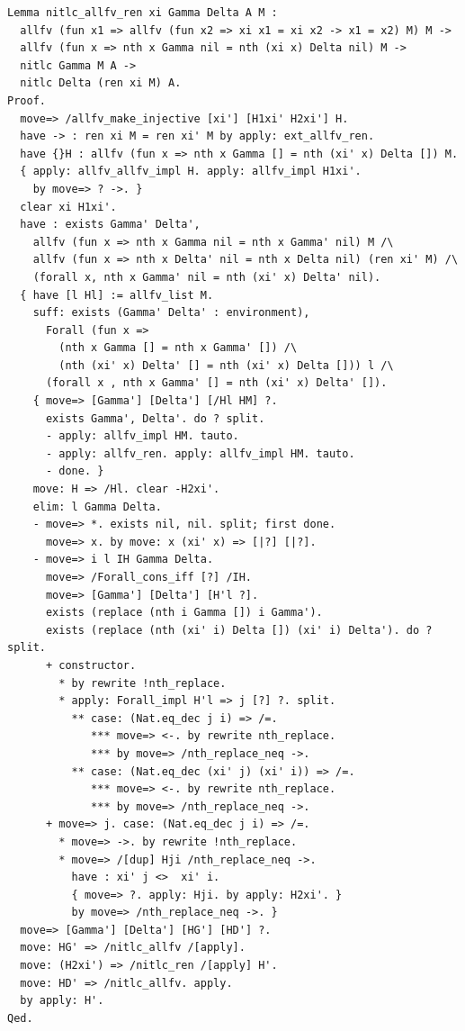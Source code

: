 \documentclass[10pt,a4paper]{article}
\begin{document}
\begin{lstlisting}[style=authorcoq]
Lemma nitlc_allfv_ren xi Gamma Delta A M :
  allfv (fun x1 => allfv (fun x2 => xi x1 = xi x2 -> x1 = x2) M) M ->
  allfv (fun x => nth x Gamma nil = nth (xi x) Delta nil) M ->
  nitlc Gamma M A ->
  nitlc Delta (ren xi M) A.
Proof.
  move=> /allfv_make_injective [xi'] [H1xi' H2xi'] H.
  have -> : ren xi M = ren xi' M by apply: ext_allfv_ren.
  have {}H : allfv (fun x => nth x Gamma [] = nth (xi' x) Delta []) M.
  { apply: allfv_allfv_impl H. apply: allfv_impl H1xi'.
    by move=> ? ->. }
  clear xi H1xi'.
  have : exists Gamma' Delta',
    allfv (fun x => nth x Gamma nil = nth x Gamma' nil) M /\
    allfv (fun x => nth x Delta' nil = nth x Delta nil) (ren xi' M) /\
    (forall x, nth x Gamma' nil = nth (xi' x) Delta' nil).
  { have [l Hl] := allfv_list M.
    suff: exists (Gamma' Delta' : environment),
      Forall (fun x => 
        (nth x Gamma [] = nth x Gamma' []) /\
        (nth (xi' x) Delta' [] = nth (xi' x) Delta [])) l /\
      (forall x , nth x Gamma' [] = nth (xi' x) Delta' []).
    { move=> [Gamma'] [Delta'] [/Hl HM] ?.
      exists Gamma', Delta'. do ? split.
      - apply: allfv_impl HM. tauto.
      - apply: allfv_ren. apply: allfv_impl HM. tauto.
      - done. }
    move: H => /Hl. clear -H2xi'.
    elim: l Gamma Delta.
    - move=> *. exists nil, nil. split; first done.
      move=> x. by move: x (xi' x) => [|?] [|?].
    - move=> i l IH Gamma Delta.
      move=> /Forall_cons_iff [?] /IH.
      move=> [Gamma'] [Delta'] [H'l ?].
      exists (replace (nth i Gamma []) i Gamma').
      exists (replace (nth (xi' i) Delta []) (xi' i) Delta'). do ? split.
      + constructor.
        * by rewrite !nth_replace.
        * apply: Forall_impl H'l => j [?] ?. split.
          ** case: (Nat.eq_dec j i) => /=.
             *** move=> <-. by rewrite nth_replace.
             *** by move=> /nth_replace_neq ->.
          ** case: (Nat.eq_dec (xi' j) (xi' i)) => /=.
             *** move=> <-. by rewrite nth_replace.
             *** by move=> /nth_replace_neq ->.
      + move=> j. case: (Nat.eq_dec j i) => /=.
        * move=> ->. by rewrite !nth_replace.
        * move=> /[dup] Hji /nth_replace_neq ->.
          have : xi' j <>  xi' i.
          { move=> ?. apply: Hji. by apply: H2xi'. }
          by move=> /nth_replace_neq ->. }
  move=> [Gamma'] [Delta'] [HG'] [HD'] ?.
  move: HG' => /nitlc_allfv /[apply].
  move: (H2xi') => /nitlc_ren /[apply] H'.
  move: HD' => /nitlc_allfv. apply.
  by apply: H'.
Qed.
\end{lstlisting}
\clearpage
\end{document}
